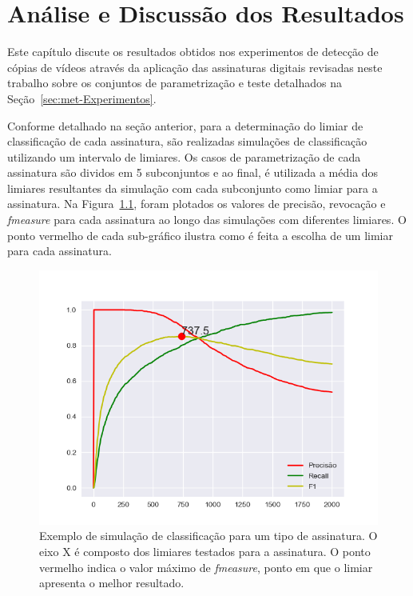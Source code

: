 
\chapter{Análise e Discussão dos Resultados}
\label{chap:resultados}

Este capítulo discute os resultados obtidos nos experimentos de detecção de cópias de vídeos através da aplicação das assinaturas digitais revisadas neste trabalho sobre os conjuntos de parametrização e teste detalhados na Seção~\ref{sec:met-Experimentos}.

Conforme detalhado na seção anterior, para a determinação do limiar de classificação de cada assinatura, são realizadas simulações de classificação utilizando um intervalo de limiares. Os casos de parametrização de cada assinatura são dividos em 5 subconjuntos e ao final, é utilizada a média dos limiares resultantes da simulação com cada subconjunto como limiar para a assinatura. Na Figura~\ref{fig:exemplo-simulacao}, foram plotados os valores de precisão, revocação e \textit{fmeasure} para cada assinatura ao longo das simulações com diferentes limiares. O ponto vermelho de cada sub-gráfico ilustra como é feita a escolha de um limiar para cada assinatura.

\begin{figure}[h]
	\centering
	\caption{Exemplo de simulação de classificação para um tipo de assinatura. O eixo X é composto dos limiares testados para a assinatura. O ponto vermelho indica o valor máximo de \textit{fmeasure}, ponto em que o limiar apresenta o melhor resultado.}
	\label{fig:exemplo-simulacao}
	\includegraphics[width=\textwidth]{dados/figuras/experimentos/limiar_Medida_Ordinal_0.png}
\end{figure}

